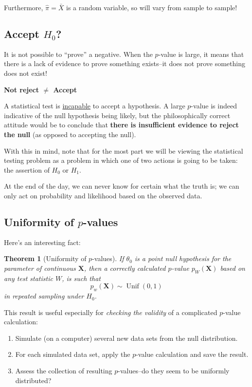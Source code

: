 \documentclass[
]{book}
\providecommand{\tightlist}{%
  \setlength{\itemsep}{0pt}\setlength{\parskip}{0pt}}
\newcommand{\bX}{{\boldsymbol X}}
\DeclareMathOperator{\Unif}{Unif}
\newtheorem{theorem}{Theorem}[chapter]
\theoremstyle{definition}
\theoremstyle{definition}
\theoremstyle{definition}
\theoremstyle{definition}
\theoremstyle{remark}
\begin{document}
Furthermore, \(\hat\pi=\bar X\) is a random variable, so will vary from sample to sample!

\hypertarget{accept-h_0}{%
\subsection{\texorpdfstring{Accept \(H_0\)?}{Accept H\_0?}}\label{accept-h_0}}

It is not possible to ``prove'' a negative. When the \(p\)-value is large, it means that there is a lack of evidence to prove something exists--it does not prove something does not exist!

\textbf{Not reject \(\neq\) Accept}

A statistical test is \underline{incapable} to accept a hypothesis. A large \(p\)-value is indeed indicative of the null hypothesis being likely, but the philosophically correct attitude would be to conclude that \textbf{there is insufficient evidence to reject the null} (as opposed to accepting the null).

With this in mind, note that for the most part we will be viewing the statistical testing problem as a problem in which one of two actions is going to be taken: the assertion of \(H_0\) or \(H_1\).

At the end of the day, we can never know for certain what the truth is; we can only act on probability and likelihood based on the observed data.

\hypertarget{uniformity-of-p-values}{%
\subsection{\texorpdfstring{Uniformity of \(p\)-values}{Uniformity of p-values}}\label{uniformity-of-p-values}}

Here's an interesting fact:

\begin{theorem}[Uniformity of \(p\)-values]
If \(\theta_0\) is a point null hypothesis for the parameter of continuous \(\bX\), then a correctly calculated \(p\)-value \(p_W(\bX)\) based on any test statistic \(W\), is such that
\[
p_w(\bX) \sim \Unif(0,1)
\]
in repeated sampling under \(H_0\).
\end{theorem}

This result is useful especially for \emph{checking the validity} of a complicated \(p\)-value calculation:

\begin{enumerate}
\def\labelenumi{\arabic{enumi}.}
\tightlist
\item
  Simulate (on a computer) several new data sets from the null distribution.
\item
  For each simulated data set, apply the \(p\)-value calculation and save the result.
\item
  Assess the collection of resulting \(p\)-values--do they seem to be uniformly distributed?
\end{enumerate}
\end{document}
